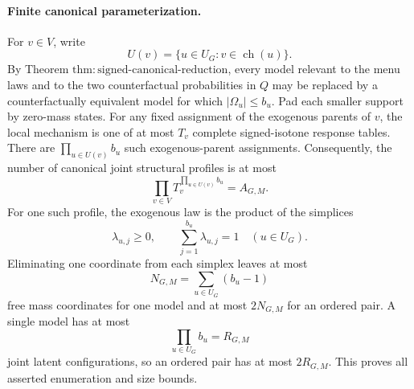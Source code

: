 \paragraph{Finite canonical parameterization.}
For \(v\in V\), write
\[
 U(v)=\{u\in U_G:v\in\operatorname{ch}(u)\}.
\]
By Theorem \(\mathrm{thm:signed\text{-}canonical\text{-}reduction}\), every model relevant to the menu laws and to the two counterfactual probabilities in \(Q\) may be replaced by a counterfactually equivalent model for which \(|\Omega_u|\le b_u\).  Pad each smaller support by zero-mass states.  For any fixed assignment of the exogenous parents of \(v\), the local mechanism is one of at most \(T_v\) complete signed-isotone response tables.  There are \(\prod_{u\in U(v)}b_u\) such exogenous-parent assignments.  Consequently, the number of canonical joint structural profiles is at most
\[
 \prod_{v\in V}T_v^{\prod_{u\in U(v)}b_u}
 =A_{G,M}.
\]
For one such profile, the exogenous law is the product of the simplices
\[
 \lambda_{u,j}\ge 0,
 \qquad
 \sum_{j=1}^{b_u}\lambda_{u,j}=1
 \quad (u\in U_G).
\]
Eliminating one coordinate from each simplex leaves at most
\[
 N_{G,M}=\sum_{u\in U_G}(b_u-1)
\]
free mass coordinates for one model and at most \(2N_{G,M}\) for an ordered pair.  A single model has at most
\[
 \prod_{u\in U_G}b_u=R_{G,M}
\]
joint latent configurations, so an ordered pair has at most \(2R_{G,M}\).  This proves all asserted enumeration and size bounds.

